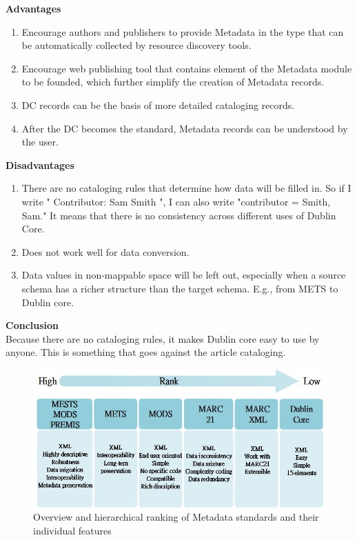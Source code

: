 \begin{enumerate}
	{\bf Advantages}
	\begin{enumerate}
		\item Encourage authors and publishers to provide Metadata in the type that can be automatically collected by resource discovery tools.
		\item Encourage web publishing tool that contains element of the Metadata module to be founded, which further simplify the creation of Metadata records.
		\item DC records can be the basis of more detailed cataloging records.
		\item After the DC becomes the standard, Metadata records can be understood by the user.
	\end{enumerate}	
	{\bf Disadvantages}
	\begin{enumerate}
		\item There are no cataloging rules that determine how data will be filled in. So if I write " Contributor: Sam Smith ", I can also write "contributor = Smith, Sam." It means that there is no consistency across different uses of Dublin Core.
		\item Does not work well for data conversion.
		\item Data values in non-mappable space will be left out, especially when a source schema has a richer structure than the target schema. E.g., from METS to Dublin core.
	\end{enumerate}
	{\bf Conclusion}\\
	Because there are no cataloging rules, it makes Dublin core easy to use by anyone. This is something that goes against the article cataloging.
	
	
\end{enumerate}



	
	\begin{figure}[ht]
		
		\begin{center}
			\includegraphics[scale=0.8]{Eagle_unit1}
		\end{center}
		\caption{Overview and hierarchical ranking of Metadata standards and their individual features}
		\vspace{20mm}
	\end{figure}
	
\newpage %





